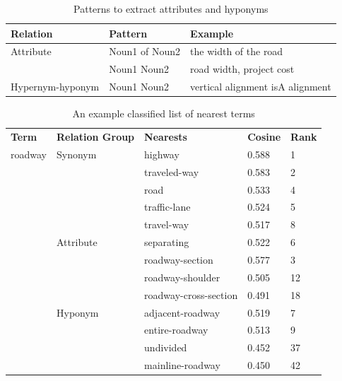 \documentclass[Journal, BackFigs,NoLists, DoubleSpace]{ascelike}%
\begin{document}
%
%
\begin{table} [t]
	\caption{Patterns to extract attributes and hyponyms}
	\label{table:attribute_pattern}
	\centering
	\small
	\renewcommand{\arraystretch}{1.25}
	\begin{tabular}{l l l}
		\hline
		\textbf{Relation} & \textbf{Pattern} & \textbf{Example}\\
		\hline
		Attribute &	Noun1 of Noun2 & the width of the road\\
		& Noun1 Noun2	&	road width, project cost\\
		Hypernym-hyponym & Noun1 Noun2 & vertical alignment isA alignment\\
		\hline
	\end{tabular}
	\normalsize
\end{table}
%
\begin{table} [t]
	\caption{An example classified list of nearest terms}
	\label{table:term_clustering}
	\centering
	\small
	\renewcommand{\arraystretch}{1.25}
	\begin{tabular}{l l l l l}
		\hline
		\textbf{Term}	&\textbf{Relation Group}	& \textbf{Nearests} & \textbf{Cosine} & \textbf{Rank}\\
		roadway			&Synonym					& highway & 0.588 & 1\\
		&							& traveled-way & 0.583 & 2\\
		&							& road & 0.533 & 4\\						
		&							& traffic-lane & 0.524 &5\\ 						
		&							& travel-way & 0.517 & 8\\  \cmidrule{2-5}
		&Attribute					& separating & 0.522 &6\\
		&							& roadway-section & 0.577 & 3\\						
		&							& roadway-shoulder & 0.505 & 12\\
		&							& roadway-cross-section & 0.491 & 18\\\cmidrule{2-5}						
		&Hyponym					& adjacent-roadway & 0.519 & 7\\
		&							& entire-roadway & 0.513 & 9\\
		&							& undivided & 0.452 & 37\\
		&							& mainline-roadway & 0.450 & 42\\
		\hline
	\end{tabular}
	\normalsize
\end{table}
%
\end{document}
